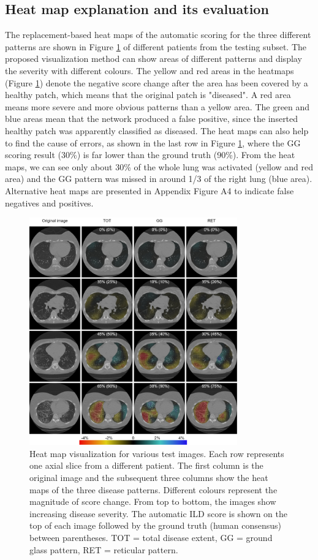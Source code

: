\subsection{Heat map explanation and its evaluation}
The replacement-based heat maps of the automatic scoring for the three different patterns are shown in Figure \ref{fig7} of different patients from the testing subset. The proposed visualization method can show areas of different patterns and display the severity with different colours. The yellow and red areas in the heatmaps (Figure \ref{fig7}) denote the negative score change after the area has been covered by a healthy patch, which means that the original patch is "diseased". A red area means more severe and more obvious patterns than a yellow area. The green and blue areas mean that the network produced a false positive, since the inserted healthy patch was apparently classified as diseased. The heat maps can also help to find the cause of errors, as shown in the last row in Figure \ref{fig7}, where the GG scoring result (30\%) is far lower than the ground truth (90\%). From the heat maps, we can see only about 30\% of the whole lung was activated (yellow and red area) and the GG pattern was missed in around 1/3 of the right lung (blue area). Alternative heat maps are presented in Appendix Figure A4 to indicate false negatives and positives.



\begin{figure}[tb]
    \centering
    \includegraphics[width=0.8\textwidth]{figure7.png}
    \caption{Heat map visualization for various test images. Each row represents one axial slice from a different patient. The first column is the original image and the subsequent three columns show the heat maps of the three disease patterns. Different colours represent the magnitude of score change.  From top to bottom, the images show increasing disease severity. The automatic ILD score is shown on the top of each image followed by the ground truth (human consensus) between parentheses. TOT = total disease extent, GG = ground glass pattern, RET = reticular pattern.}
    \label{fig7}
\end{figure}

